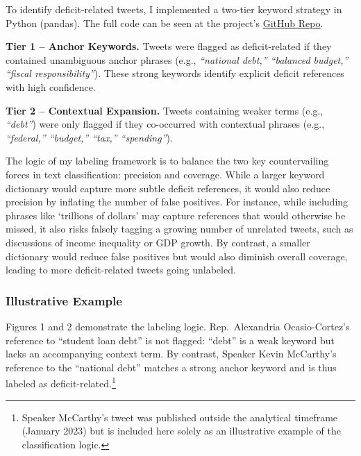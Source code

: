 \documentclass[
  12pt,
]{article}
\begin{document}
To identify deficit-related tweets, I implemented a two-tier keyword
strategy in Python (pandas). The full code can be seen at the project's
\href{https://github.com/cycoldiron/congress-fiscal-tweets}{GitHub
Repo}.

\textbf{Tier 1 -- Anchor Keywords.} Tweets were flagged as
deficit-related if they contained unambiguous anchor phrases (e.g.,
\emph{``national debt,'' ``balanced budget,'' ``fiscal
responsibility''}). These strong keywords identify explicit deficit
references with high confidence.

\textbf{Tier 2 -- Contextual Expansion.} Tweets containing weaker terms
(e.g., \emph{``debt''}) were only flagged if they co-occurred with
contextual phrases (e.g., \emph{``federal,'' ``budget,'' ``tax,''
``spending''}).

The logic of my labeling framework is to balance the two key
countervailing forces in text classification: precision and coverage.
While a larger keyword dictionary would capture more subtle deficit
references, it would also reduce precision by inflating the number of
false positives. For instance, while including phrases like `trillions
of dollars' may capture references that would otherwise be missed, it
also risks falsely tagging a growing number of unrelated tweets, such as
discussions of income inequality or GDP growth. By contrast, a smaller
dictionary would reduce false positives but would also diminish overall
coverage, leading to more deficit-related tweets going unlabeled.

\subsubsection{Illustrative Example}\label{illustrative-example}

Figures 1 and 2 demonstrate the labeling logic. Rep.~Alexandria
Ocasio-Cortez's reference to ``student loan debt'' is not flagged:
``debt'' is a weak keyword but lacks an accompanying context term. By
contrast, Speaker Kevin McCarthy's reference to the ``national debt''
matches a strong anchor keyword and is thus labeled as
deficit-related.\footnote{Speaker McCarthy's tweet was published outside
  the analytical timeframe (January 2023) but is included here solely as
  an illustrative example of the classification logic.}
\end{document}

